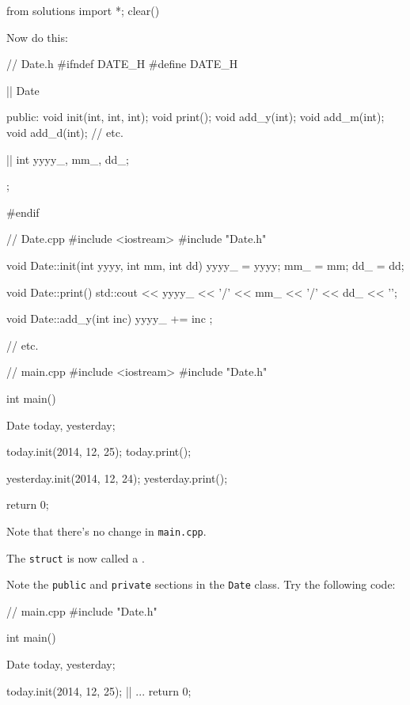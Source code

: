\begin{python0}
from solutions import *; clear()
\end{python0}

Now do this:

\begin{consolethree}[escapeinside=||]
// Date.h
#ifndef DATE_H
#define DATE_H

|| Date
{
public:
    void init(int, int, int);
    void print();
    void add_y(int);
    void add_m(int);
    void add_d(int);
    // etc.

||
    int yyyy_, mm_, dd_;
};

#endif
\end{consolethree}

\begin{consolethree}[escapeinside=||]
// Date.cpp
#include <iostream>
#include "Date.h"

void Date::init(int yyyy, int mm, int dd)
{
    yyyy_ = yyyy;
    mm_ = mm;
    dd_ = dd;
}

void Date::print()
{
    std::cout << yyyy_ << '/'
              << mm_ << '/'
              << dd_ << '\n';
}

void Date::add_y(int inc)
{
    yyyy_ += inc ;
}

// etc.
\end{consolethree}

\begin{consolethree}[escapeinside=||]
// main.cpp
#include <iostream>
#include "Date.h"

int main()
{
    Date today, yesterday;
    
    today.init(2014, 12, 25);
    today.print();
    
    yesterday.init(2014, 12, 24);
    yesterday.print();
    
    return 0;
}
\end{consolethree}

Note that there's no change in \texttt{main.cpp}.

The \texttt{struct} is now called a .

Note the \texttt{public} and \texttt{private} sections in the \texttt{Date}
class. Try the following code:

\begin{consolethree}[escapeinside=||]
// main.cpp
#include "Date.h"

int main()
{
    Date today, yesterday;
    
    today.init(2014, 12, 25);
    ||
    ...
    return 0;
}
\end{consolethree}

